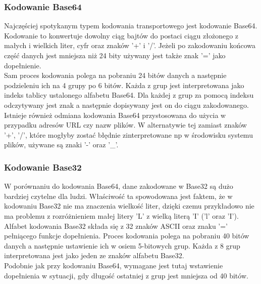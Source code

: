 \subsubsection{Kodowanie Base64}
Najczęściej spotykanym typem kodowania transportowego jest kodowanie Base64. Kodowanie to konwertuje dowolny ciąg bajtów do postaci ciągu złożonego z małych i wielkich liter, cyfr oraz znaków '+' i '/'. 
Jeżeli po zakodowaniu końcowa część danych jest mniejsza niż 24 bity używany jest także znak '=' jako dopełnienie. \\
Sam proces kodowania polega na pobraniu 24 bitów danych a następnie podzieleniu ich na 4 grupy po 6 bitów. Każda z grup jest interpretowana jako indeks tablicy ustalonego alfabetu Base64.
Dla każdej z grup za pomocą indeksu odczytywany jest znak a następnie dopisywany jest on do ciągu zakodowanego. \\
Istnieje również odmiana kodowania Base64 przystosowana do użycia w przypadku adresów URL czy nazw plików.
W alternatywie tej zamiast znaków '+', '/', które mogłyby zostać błędnie zinterpretowane np w środowisku systemu plików,
używane są znaki '-' oraz '\_'.

\subsubsection{Kodowanie Base32}
W porównaniu do kodowania Base64, dane zakodowane w Base32 są dużo bardziej czytelne dla ludzi.
Właściwość ta spowodowana jest faktem, że w kodowaniu Base32 nie ma znaczenia wielkość liter, dzięki czemu przykładowo
nie ma problemu z rozróżnieniem małej litery 'L' z wielką literą 'I' ('l' oraz 'I'). \\
Alfabet kodowania Base32 składa się z 32 znaków ASCII oraz znaku '=' pełniącego funkcje dopełnienia.
Proces kodowania polega na pobraniu 40 bitów danych a następnie ustawienie ich w osiem 5-bitowych grup. 
Każda z 8 grup interpretowana jest jako jeden ze znaków alfabetu Base32. \\
Podobnie jak przy kodowaniu Base64, wymagane jest tutaj wstawienie dopełnienia w sytuacji, gdy długość ostatniej z grup jest mniejsza od 40 bitów.

